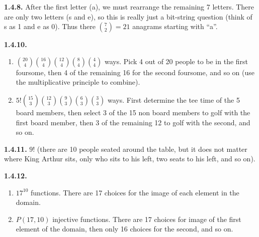 \documentclass[12pt,]{book}
\theoremstyle{plain}
\theoremstyle{definition}
\theoremstyle{definition}
\theoremstyle{definition}
\numberwithin{equation}{chapter}
\begin{document}
%
\par\smallskip
\noindent\textbf{1.4.8.} \hypertarget{p-992}{}%
After the first letter (a), we must rearrange the remaining 7 letters. There are only two letters (s and e), so this is really just a bit-string question (think of s as 1 and e as 0). Thus there \({7 \choose 2} = 21\) anagrams starting with ``a''.%
\par\smallskip
\noindent\textbf{1.4.10.} \hypertarget{p-997}{}%
\leavevmode%
\begin{enumerate}[label=(\alph*)]
\item\hypertarget{li-464}{}\({20 \choose 4}{16 \choose 4}{12 \choose 4}{8 \choose 4}{4 \choose 4}\) ways. Pick 4 out of 20 people to be in the first foursome, then 4 of the remaining 16 for the second foursome, and so on (use the multiplicative principle to combine).%
\item\hypertarget{li-465}{}\(5!{15 \choose 3}{12 \choose 3}{9 \choose 3}{6 \choose 3}{3 \choose 3}\) ways.  First determine the tee time of the 5 board members, then select 3 of the 15 non board members to golf with the first board member, then 3 of the remaining 12 to golf with the second, and so on.%
\end{enumerate}
%
\par\smallskip
\noindent\textbf{1.4.11.} \hypertarget{p-999}{}%
\(9!\) (there are 10 people seated around the table, but it does not matter where King Arthur sits, only who sits to his left, two seats to his left, and so on).%
\par\smallskip
\noindent\textbf{1.4.12.} \hypertarget{p-1003}{}%
\leavevmode%
\begin{enumerate}[label=(\alph*)]
\item\hypertarget{li-468}{}\(17^{10}\) functions.  There are 17 choices for the image of each element in the domain.%
\item\hypertarget{li-469}{}\(P(17, 10)\) injective functions.  There are 17 choices for image of the first element of the domain, then only 16 choices for the second, and so on.%
\end{enumerate}
%
\par\smallskip
\end{document}
